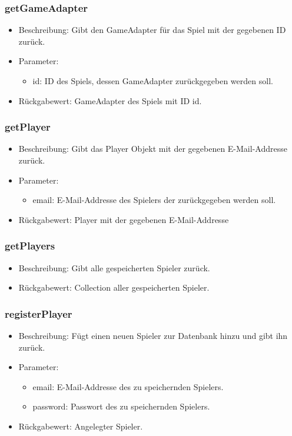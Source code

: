 \documentclass[a4paper]{scrreprt}
\begin{document}
	\subsubsection{getGameAdapter}
	\begin{itemize}
		\item Beschreibung: Gibt den GameAdapter für das Spiel mit der gegebenen ID zurück.
		\item Parameter:
		\begin{itemize}
			\item id: ID des Spiels, dessen GameAdapter zurückgegeben werden soll.
		\end{itemize}
		\item Rückgabewert: GameAdapter des Spiels mit ID id.
	\end{itemize}

	\subsubsection{getPlayer}
	\begin{itemize}
		\item Beschreibung: Gibt das Player Objekt mit der gegebenen E-Mail-Addresse zurück.
		\item Parameter:
		\begin{itemize}
			\item email: E-Mail-Addresse des Spielers der zurückgegeben werden soll.
		\end{itemize}
		\item Rückgabewert: Player mit der gegebenen E-Mail-Addresse
	\end{itemize}

	\subsubsection{getPlayers}
	\begin{itemize}
		\item Beschreibung: Gibt alle gespeicherten Spieler zurück.
		\item Rückgabewert: Collection aller gespeicherten Spieler.
	\end{itemize}

	\subsubsection{registerPlayer}
	\begin{itemize}
		\item Beschreibung: Fügt einen neuen Spieler zur Datenbank hinzu und gibt ihn zurück.
		\item Parameter:
		\begin{itemize}
			\item email: E-Mail-Addresse des zu speichernden Spielers.
			\item password: Passwort des zu speichernden Spielers.
		\end{itemize}
		\item Rückgabewert: Angelegter Spieler.
	\end{itemize}
\end{document}
